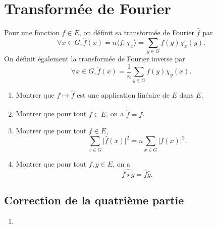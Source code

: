 \documentclass{article}[a4paper]
\newcommand{\braket}[2]{\langle #1,#2\rangle}
\begin{document}
\section{Transformée de Fourier}
Pour une fonction \(f\in E\), on définit sa transformée de Fourier \(\hat{f}\) par 
\begin{equation*}
    \forall x\in G, \hat{f}(x) = n\braket{f}{\chi_x} = \sum_{y\in G} f(y)\overline{\chi_x(y)}.
\end{equation*}
On définit également la transformée de Fourier inverse par
\begin{equation*}
    \forall x\in G, \tilde{f}(x) = \frac{1}{n}\sum_{y\in G} f(y)\chi_y(x).
\end{equation*}
\begin{enumerate}
    \item Montrer que \(f\mapsto \hat{f}\) est une application linéaire de \(E\) dans \(E\).
    \item Montrer que pour tout \(f\in E\), on a \(\tilde{\hat{f}} = f\).
    \item Montrer que pour tout \(f\in E\), 
    \begin{equation*}
        \sum_{x\in G} \lvert \hat{f}(x)\rvert^2 = n\sum_{x\in G} \lvert f(x)\rvert^2.
    \end{equation*}
    \item Montrer que pour tout \(f,g\in E\), on a
    \begin{equation*}
        \widehat{f\star g} = \hat{f}\hat{g}.
    \end{equation*}
\end{enumerate}
\subsection*{Correction de la quatrième partie}
\begin{enumerate}
    \item 
\end{enumerate}
\end{document}
